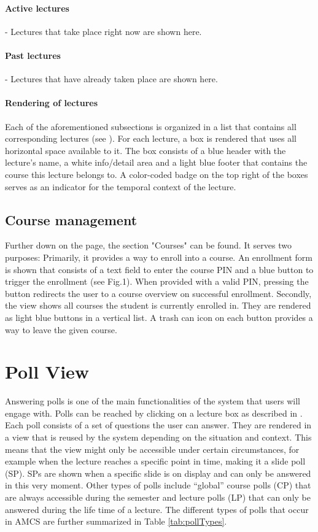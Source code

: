 \paragraph{Active lectures} - Lectures that take place right now are shown here.
\paragraph{Past lectures} - Lectures that have already taken place are shown here.

\paragraph{Rendering of lectures}

Each of the aforementioned subsections is organized in a list that contains all corresponding lectures (see \todosct). For each lecture, a box is rendered that uses all horizontal space available to it. The box consists of a blue header with the lecture's name, a white info/detail area and a light blue footer that contains the course this lecture belongs to.
A color-coded badge on the top right of the boxes serves as an indicator for the temporal context of the lecture.


\subsection{Course management}

Further down on the page, the section "Courses" can be found. It serves two purposes: Primarily, it provides a way to enroll into a course. An enrollment form is shown that consists of a text field to enter the course PIN and a blue button to trigger the enrollment (see Fig.1). When provided with a valid PIN, pressing the button redirects the user to a course overview on successful enrollment.
Secondly, the view shows all courses the student is currently enrolled in. They are rendered as light blue buttons in a vertical list. A trash can icon on each button provides a way to leave the given course.


\section{Poll View}
Answering polls is one of the main functionalities of the system that users will engage with.
Polls can be reached by clicking on a lecture box as described in \todosct.
Each poll consists of a set of questions the user can answer. They are rendered in a view that is reused  by the system depending on the situation and context. This means that the view might only be accessible under certain circumstances, for example when the lecture reaches a specific point in time, making it a slide poll (SP). SPs are shown when a specific slide is on display and can only be answered in this very moment. Other types of polls include “global” course polls (CP) that are always accessible during the semester and lecture polls (LP) that can only be answered during the life time of a lecture. The different types of polls that occur in AMCS are further summarized in Table \ref{tab:pollTypes}.

